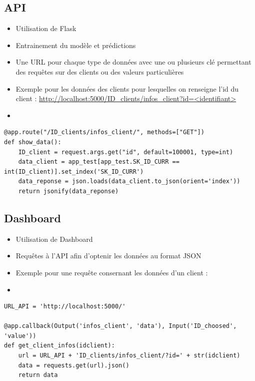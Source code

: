 \documentclass[8pt,aspectratio=169,hyperref={unicode=true}]{beamer}
\begin{document}
\subsection{API}
\begin{frame}[fragile]{\insertsection}{\insertsubsection}
    \begin{itemize}
        \item Utilisation de Flask
        \item Entrainement du modèle et prédictions
        \item Une URL pour chaque type de données avec une ou plusieurs clé permettant des requêtes sur des clients ou des valeurs particulières
        \item Exemple pour les données des clients pour lesquelles on renseigne l'id du client : \url{http://localhost:5000/ID_clients/infos_client?id=<identifiant>}
        \item[]
    \end{itemize}
    \begin{verbatim}
@app.route("/ID_clients/infos_client/", methods=["GET"])
def show_data():
    ID_client = request.args.get("id", default=100001, type=int)
    data_client = app_test[app_test.SK_ID_CURR == int(ID_client)].set_index('SK_ID_CURR')
    data_reponse = json.loads(data_client.to_json(orient='index'))
    return jsonify(data_reponse)    
    \end{verbatim}
\end{frame}

\subsection{Dashboard}
\begin{frame}[fragile]{\insertsection}{\insertsubsection}
    \begin{itemize}
        \item Utilisation de Dashboard
        \item Requêtes à l'API afin d'optenir les données au format JSON
        \item Exemple pour une requête consernant les données d'un client :
        \item[]
    \end{itemize}
    \begin{verbatim}
URL_API = 'http://localhost:5000/'

@app.callback(Output('infos_client', 'data'), Input('ID_choosed', 'value'))
def get_client_infos(idclient):
    url = URL_API + 'ID_clients/infos_client/?id=' + str(idclient)
    data = requests.get(url).json()
    return data 
            \end{verbatim}
\end{frame}
\end{document}
